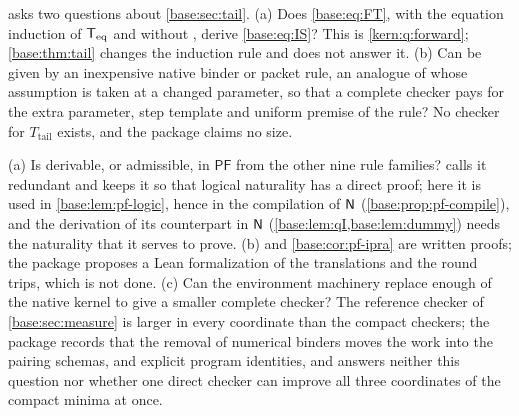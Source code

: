 \begin{question}
\label{base:q:tail}
 asks two questions about \cref{base:sec:tail}.
(a) Does \eqref{base:eq:FT}, with the equation induction of $\mathsf{T}_{\mathrm{eq}}$ and
without , derive \eqref{base:eq:IS}?  This is
\cref{kern:q:forward}; \cref{base:thm:tail} changes the induction rule and
does not answer it.  (b) Can  be given by an inexpensive
native binder or packet rule, an analogue of  whose assumption
is taken at a changed parameter, so that a complete checker pays for the
extra parameter, step template and uniform premise of the rule?  No
checker for $T_{\mathrm{tail}}$ exists, and the package claims no size.
\end{question}

\begin{question}
\label{base:q:pf}
(a) Is  derivable, or admissible, in $\mathsf{PF}$ from the
other nine rule families?   calls it redundant and keeps
it so that logical naturality has a direct proof; here it is used in
\cref{base:lem:pf-logic}, hence in the compilation of $\mathsf{N}$
(\cref{base:prop:pf-compile}), and the derivation of its counterpart in
$\mathsf{N}$ (\cref{base:lem:qI,base:lem:dummy}) needs the naturality that it
serves to prove.  (b)  and \cref{base:cor:pf-ipra} are
written proofs; the package proposes a Lean formalization of the
translations and the round trips, which is not done.  (c) Can the
environment machinery replace enough of the native kernel to give a
smaller complete checker?  The reference checker of
\cref{base:sec:measure} is larger in every coordinate than the compact
checkers; the package records that the removal of numerical binders moves
the work into the pairing schemas,  and explicit program
identities, and answers neither this question nor whether one direct
checker can improve all three coordinates of the compact minima at once.
\end{question}
